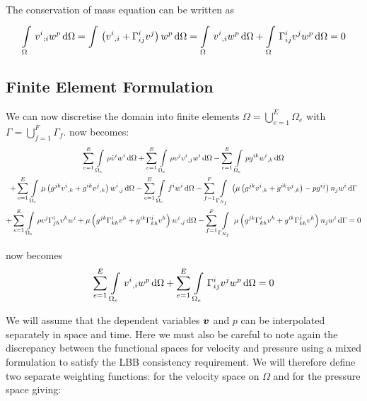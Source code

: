 The conservation of mass equation can be written as
\begin{equation}
  \gint{\Omega}{}{\covarderiv{v^{i}}{i}w^{p}}{\Omega}=
  \gint{}{}{\pbrac{\partialderiv{v^{i}}{i}+\christoffel{i}{i}{j}v^{j}}w^{p}}{\Omega}=
  \gint{\Omega}{}{\partialderiv{v^{i}}{i}w^{p}}{\Omega}+\gint{\Omega}{}{\christoffel{i}{i}{j}v^{j}w^{p}}{\Omega}=0
  \label{eqn:TensorConvOfMass}
\end{equation}

\subsection{Finite Element Formulation}

We can now discretise the domain into finite elements \ie
$\Omega=\displaystyle{\bigcup_{e=1}^{E}}\Omega_{e}$ with
$\Gamma=\displaystyle{\bigcup_{f=1}^{F}}\Gamma_{f}$.  now
becomes:
\begin{multline}
  \gsum{e=1}{E}{\gint{\Omega_{e}}{}{\rho\dot{v}^{i}w^{i}}{\Omega}}
 +\gsum{e=1}{E}{\gint{\Omega_{e}}{}{\rho v^{j}\partialderiv{v^{i}}{j}{w^{i}}}{\Omega}}
 -\gsum{e=1}{E}{\gint{\Omega_{e}}{}{pg^{ik}\partialderiv{w^{i}}{k}}{\Omega}}\\
 +\gsum{e=1}{E}{\gint{\Omega_{e}}{}{\mu\pbrac{g^{jk}\partialderiv{v^{i}}{k}+
       g^{ik}\partialderiv{v^{j}}{k}}\partialderiv{w^{i}}{j}}{\Omega}}
 -\gsum{e=1}{E}{\gint{\Omega_{e}}{}{f^{i}w^{i}}{\Omega}}
 -\gsum{f=1}{F}{\gint{\Gamma_{N_{f}}}{}{\pbrac{\mu\pbrac{g^{jk}\partialderiv{v^{i}}{k}+g^{ik}\partialderiv{v^{j}}{k}}-pg^{ij}}n_{j}w^{i}}{\Gamma}}\\
 +\gsum{e=1}{E}{\gint{\Omega_{e}}{}{\rho
   v^{j}\christoffel{i}{j}{h}v^{h}w^{i}+\mu\pbrac{g^{jk}\christoffel{i}{k}{h}v^{h}+
     g^{ik}\christoffel{j}{k}{h}v^{h}}\partialderiv{w^{i}}{j}}{\Omega}}
 -\gsum{f=1}{F}{\gint{\Gamma_{N_{f}}}{}{\mu\pbrac{g^{jk}\christoffel{i}{k}{h}v^{h}+g^{ik}\christoffel{j}{k}{h}v^{h}}n_{j}w^{i}}{\Gamma}}=0
 \label{eqn:FEMNSE}
\end{multline}

 now becomes
\begin{equation}
  \gsum{e=1}{E}{\gint{\Omega_{e}}{}{\partialderiv{v^{i}}{i}w^{p}}{\Omega}}
  +\gsum{e=1}{E}{\gint{\Omega_{e}}{}{\christoffel{i}{i}{j}v^{j}w^{p}}{\Omega}}=0
\end{equation}

We will assume that the dependent variables $ \boldsymbol{v} $ and $p$ can be
interpolated separately in space and time. Here we must also be careful to
note again the discrepancy between the functional spaces for velocity and
pressure using a mixed formulation to satisfy the LBB consistency
requirement. We will therefore define two separate weighting functions: for
the velocity space on $\Omega$ and for the pressure space giving:


